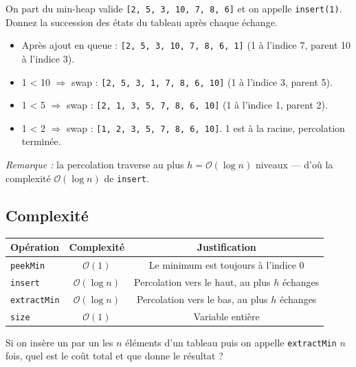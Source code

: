 \documentclass[11pt,a4paper]{article}
\newcommand{\bigO}{\mathcal{O}}
\begin{document}
\begin{appliboxQ}
On part du min-heap valide \texttt{[2, 5, 3, 10, 7, 8, 6]} et on appelle \texttt{insert(1)}. Donnez la succession des états du tableau après chaque échange.
\end{appliboxQ}

\begin{appliboxR}[Réponse]
\begin{itemize}[nosep]
    \item Après ajout en queue : \texttt{[2, 5, 3, 10, 7, 8, 6, 1]} (1 à l'indice 7, parent 10 à l'indice 3).
    \item 1 < 10 $\Rightarrow$ swap : \texttt{[2, 5, 3, 1, 7, 8, 6, 10]} (1 à l'indice 3, parent 5).
    \item 1 < 5 $\Rightarrow$ swap : \texttt{[2, 1, 3, 5, 7, 8, 6, 10]} (1 à l'indice 1, parent 2).
    \item 1 < 2 $\Rightarrow$ swap : \texttt{[1, 2, 3, 5, 7, 8, 6, 10]}. 1 est à la racine, percolation terminée.
\end{itemize}
\emph{Remarque :} la percolation traverse au plus $h = \bigO(\log n)$ niveaux --- d'où la complexité $\bigO(\log n)$ de \texttt{insert}.
\end{appliboxR}

\subsection{Complexité}

\begin{center}
\renewcommand{\arraystretch}{1.3}
\begin{tabular}{@{}lcc@{}}
\toprule
\textbf{Opération} & \textbf{Complexité} & \textbf{Justification} \\
\midrule
\texttt{peekMin}     & $\bigO(1)$        & Le minimum est toujours à l'indice 0 \\
\texttt{insert}      & $\bigO(\log n)$   & Percolation vers le haut, au plus $h$ échanges \\
\texttt{extractMin}  & $\bigO(\log n)$   & Percolation vers le bas, au plus $h$ échanges \\
\texttt{size}        & $\bigO(1)$        & Variable entière \\
\bottomrule
\end{tabular}
\end{center}

\begin{appliboxQ}
Si on insère un par un les $n$ éléments d'un tableau puis on appelle \texttt{extractMin} $n$ fois, quel est le coût total et que donne le résultat ?
\end{appliboxQ}
\end{document}
